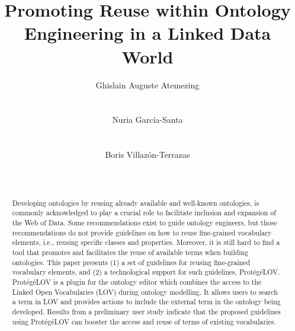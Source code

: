 \documentclass{sig-alternate}
\begin{document}


\title{Promoting Reuse within Ontology Engineering in a Linked Data World}

\author{
\alignauthor Ghislain Auguste Atemezing\\
       \\
       \\
  \alignauthor Nuria Garc{\'i}a-Santa\\
       \\
       \\
\alignauthor Boris Villaz{\'o}n-Terrazas\\
       \\
       \\
}

\maketitle



\begin{abstract}
Developing ontologies by reusing already available and well-known ontologies, is commonly acknowledged to play a crucial role to facilitate inclusion and expansion of the Web of Data. Some recommendations exist to guide ontology engineers, but those recommendations do not provide guidelines on how to reuse fine-grained vocabulary elements, i.e., reusing specific classes and properties. Moreover, it is still hard to find a tool that promotes and facilitates the reuse of available terms when building ontologies. This paper presents (1) a set of guidelines for reusing fine-grained vocabulary elements, and (2) a technological support for such guidelines, Prot{\'e}g{\'e}LOV. Prot{\'e}g{\'e}LOV is a plugin for the ontology editor which combines the access to the Linked Open Vocabularies (LOV) during ontology modelling. It allows users to search a term in LOV and provides actions to include the external term in the ontology being developed. Results from a preliminary user study indicate that the proposed guidelines using Prot{\'e}g{\'e}LOV can booster the access and reuse of terms of existing vocabularies.
\end{abstract}
\end{document}
